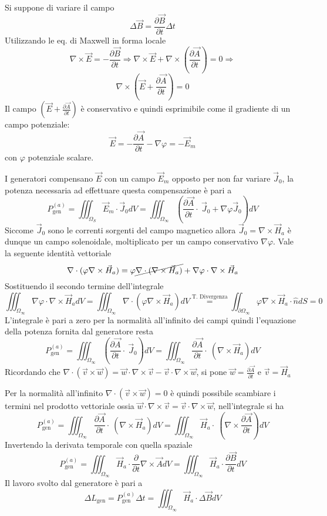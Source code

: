 Si suppone di variare il campo
$$
\Delta\vec{B} = \frac{\partial \vec{B}}{\partial t} \Delta t
$$
Utilizzando le eq. di Maxwell in forma locale
$$
\nabla\times\vec{E} = -\frac{\partial \vec{B}}{\partial t} \Rightarrow \nabla\times\vec{E} 
+ \nabla \times \left(\frac{\partial \vec{A}}{\partial t}\right) = 0 \Rightarrow 
$$
$$
\nabla\times\left(\vec{E}+\frac{\partial\vec{A}}{\partial t}\right) = 0
$$
Il campo $\left(\vec{E} + \frac{\partial \vec{A}}{\partial t}\right)$ è conservativo e 
quindi esprimibile come il gradiente di un campo potenziale:
$$
\vec{E} = -\frac{\partial \vec{A}}{\partial t} - \nabla\varphi = -\vec{E}_m
$$
con $\varphi$ potenziale scalare.

I generatori compensano $\vec{E}$ con un campo $\vec{E}_m$ opposto per non far
variare $\vec{J}_0$, la potenza necessaria ad effettuare questa compensazione è pari
a 
$$
P^{(a)}_{\text{gen}} = \iiint_{\Omega_S} \vec{E}_m\cdot\vec{J}_0 dV = 
\iiint_{\Omega_\infty} \left(\frac{\partial \vec{A}}{\partial t} \cdot\ \vec{J}_0 + \nabla\varphi \vec{J}_0\right) dV
$$
Siccome $\vec{J}_0$ sono le correnti sorgenti del campo magnetico allora $\vec{J}_0 = \nabla\times\vec{H}_a$
è dunque un campo solenoidale, moltiplicato per un campo conservativo $\nabla\varphi$.
Vale la seguente identità vettoriale
$$
\nabla\cdot(\varphi \nabla\times \vec{H}_a) = \varphi\cancel{\nabla\cdot(\nabla\times\vec{H}_a)} +
\nabla\varphi\cdot\nabla\times\vec{H}_a
$$
Sostituendo il secondo termine dell'integrale
$$
\iiint_{\Omega_\infty}\nabla\varphi\cdot\nabla\times\vec{H}_a dV = \iiint_{\Omega_\infty} \nabla\cdot(\varphi\nabla\times\vec{H}_a) dV \stackrel{\text{T. Divergenza}}{=} \iint_{\partial\Omega_\infty} \varphi\nabla\times\vec{H}_a\cdot\hat{n}dS = 0
$$
L'integrale è pari a zero per la normalità all'infinito dei campi quindi l'equazione
della potenza fornita dal generatore resta
$$
P^{(a)}_{\text{gen}} =
\iiint_{\Omega_\infty} \left(\frac{\partial \vec{A}}{\partial t} \cdot\ \vec{J}_0 \right) dV = \iiint_{\Omega_\infty} \frac{\partial \vec{A}}{\partial t} \cdot\ \left( \nabla\times\vec{H}_a \right) dV
$$
Ricordando che $\nabla\cdot(\vec{v}\times\vec{w}) = \vec{w}\cdot\nabla\times\vec{v} -  \vec{v}\cdot\nabla\times\vec{w}$, si pone $\vec{w} = \frac{\partial \vec{A}}{\partial t}$ e
$\vec{v} = \vec{H}_a$

Per la normalità all'infinito $\nabla\cdot(\vec{v}\times\vec{w}) = 0$ è quindi possibile
scambiare i termini nel prodotto vettoriale ossia $\vec{w}\cdot\nabla\times\vec{v} = \vec{v}\cdot\nabla\times\vec{w} $, nell'integrale si ha
$$
P^{(a)}_{\text{gen}} = \iiint_{\Omega_\infty} \frac{\partial \vec{A}}{\partial t} \cdot\ \left( \nabla\times\vec{H}_a \right) dV = \iiint_{\Omega_\infty} \vec{H}_a \cdot\ \left( \nabla\times\frac{\partial \vec{A}}{\partial t} \right) dV
$$
Invertendo la derivata temporale con quella spaziale
$$
P^{(a)}_{\text{gen}} = \iiint_{\Omega_\infty}\vec{H}_a \cdot\frac{\partial}{\partial t} \nabla\times\vec{A} dV =  \iiint_{\Omega_\infty}\vec{H}_a \cdot \frac{\partial \vec{B}}{\partial t} dV
$$
Il lavoro svolto dal generatore è pari a 
$$
\Delta L_{\text{gen}} = P^{(a)}_{\text{gen}} \Delta t = \iiint_{\Omega_\infty} \vec{H}_a
\cdot\Delta\vec{B} dV
$$

